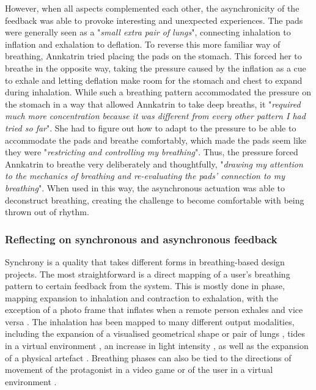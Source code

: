However, when all aspects complemented each other, the asynchronicity of the feedback was able to provoke interesting and unexpected experiences. The pads were generally seen as a "\textit{small extra pair of lungs}", connecting inhalation to inflation and exhalation to deflation. To reverse this more familiar way of breathing, Annkatrin tried placing the pads on the stomach. This forced her to breathe in the opposite way, taking the pressure caused by the inflation as a cue to exhale and letting deflation make room for the stomach and chest to expand during inhalation. While such a breathing pattern accommodated the pressure on the stomach in a way that allowed Annkatrin to take deep breaths, it "\textit{required much more concentration because it was different from every other pattern I had tried so far}". She had to figure out how to adapt to the pressure to be able to accommodate the pads and breathe comfortably, which made the pads seem like they were "\textit{restricting and controlling my breathing}". Thus, the pressure forced Annkatrin to breathe very deliberately and thoughtfully, "\textit{drawing my attention to the mechanics of breathing and re-evaluating the pads’ connection to my breathing}". When used in this way, the asynchronous actuation was able to deconstruct breathing, creating the challenge to become comfortable with being thrown out of rhythm.


\subsubsection{Reflecting on synchronous and asynchronous feedback}

Synchrony is a quality that takes different forms in breathing-based design projects. The most straightforward is a direct mapping of a user's breathing pattern to certain feedback from the system. This is mostly done in phase, mapping expansion to inhalation and contraction to exhalation, with the exception of a photo frame that inflates when a remote person exhales and vice versa \cite{kim_breathingframe_2015}. The inhalation has been mapped to many different output modalities, including the expansion of a visualised geometrical shape \cite{van_rooij_deep_2016, prpa_hacking_2016, wongsuphasawat_you_2012} or pair of lungs \cite{abushakra_augmenting_2014}, tides in a virtual environment \cite{roo_inner_2017}, an increase in light intensity \cite{dijk_breathe_2011, stahl_soma_2016}, as well as the expansion of a physical artefact \cite{aslan_hold_2016, kim_breathingframe_2015, sun_breath_2017, moran_exopranayama:_2016, sjoman_breathing_2018}. Breathing phases can also be tied to the directions of movement of the protagonist in a video game \cite{sonne_chillfish_2016} or of the user in a virtual environment \cite{van_rooij_deep_2016, davies_osmose_1996, prpa_hacking_2016}.

